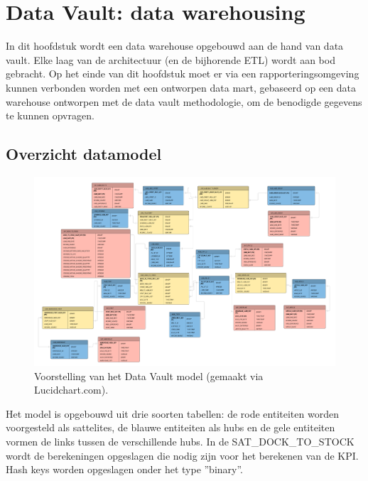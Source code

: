 
\chapter{Data Vault: data warehousing}
\label{ch:dvmodel}
In dit hoofdstuk wordt een data warehouse opgebouwd aan de hand van data vault. Elke laag van de architectuur (en de bijhorende ETL) wordt aan bod gebracht. Op het einde van dit hoofdstuk moet er via een rapporteringsomgeving kunnen verbonden worden met een ontworpen data mart, gebaseerd op een data warehouse ontworpen met de data vault methodologie, om de benodigde gegevens te kunnen opvragen.

\newpage
\section{Overzicht datamodel}
\begin{figure}[h]
	\centering
	\includegraphics[scale=0.34]{../images/DataVaultModel.png}
	\caption{Voorstelling van het Data Vault model (gemaakt via Lucidchart.com).}
	\label{fig:dvm}
\end{figure}

Het model is opgebouwd uit drie soorten tabellen: de rode entiteiten worden voorgesteld als sattelites, de blauwe entiteiten als hubs en de gele entiteiten vormen de links tussen de verschillende hubs. In de SAT\_DOCK\_TO\_STOCK wordt de berekeningen opgeslagen die nodig zijn voor het berekenen van de KPI. Hash keys worden opgeslagen onder het type ''binary''.

